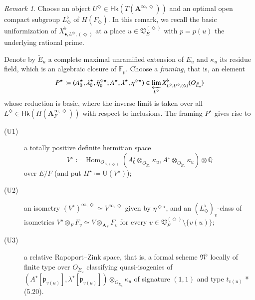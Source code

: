 \documentclass[12pt]{amsart}
\numberwithin{equation}{section}
\theoremstyle{plain}
\theoremstyle{definition}
\theoremstyle{remark}
\newtheorem{remark}[proposition]{Remark}
\renewcommand{\b}[1]{\mathbf{#1}}
\renewcommand{\d}[1]{\mathbb{#1}}
\newcommand{\f}[1]{\mathfrak{#1}}
\renewcommand{\r}[1]{\mathrm{#1}}
\renewcommand{\sf}[1]{\mathsf{#1}}
\renewcommand{\(}{\left(}
\renewcommand{\)}{\right)}
\newcommand{\bA}{\b A}
\newcommand{\dF}{\d F}
\newcommand{\dQ}{\d Q}
\newcommand{\fN}{\f N}
\newcommand{\fV}{\f V}
\newcommand{\fp}{\f p}
\newcommand{\rU}{\r U}
\newcommand{\Hk}{\sf{Hk}}
\DeclareMathOperator{\Hom}{Hom}
\begin{document}
\begin{remark}\label{re:uniformization}
Choose an object $U^\Diamond\in\Hk(T(\bA^{\infty,\Diamond}))$ and an optimal open compact subgroup $L^\flat_\Diamond$ of $H(F_\Diamond)$. In this remark, we recall the basic uniformization of $X^\flat_{\bullet,U^\Diamond,(\Diamond)}$ at a place $u\in\fV_E^{(\Diamond)}$ with $p=p(u)$ the underlying rational prime.

Denote by $\breve{E}_u$ a complete maximal unramified extension of $E_u$ and $\kappa_u$ its residue field, which is an algebraic closure of $\dF_p$. Choose a \emph{framing}, that is, an element
\[
P^\star\coloneqq (A_0^\star,\lambda_0^\star,\bar\eta_0^{\Diamond\star};A^\star,\lambda^\star,\eta^{\Diamond\star})\in
\varprojlim_{L^\Diamond}X^\flat_{L^\Diamond,U^\Diamond,(\Diamond)}(O_{\breve{E}_u})
\]
whose reduction is basic, where the inverse limit is taken over all $L^\Diamond\in\Hk(H(\bA_F^{\infty,\Diamond}))$ with respect to inclusions. The framing $P^\star$ gives rise to
\begin{description}
  \item[(U1)] a totally positive definite hermitian space
      \[
      V^\star\coloneqq
      \Hom_{O_{E,(\Diamond)}}(A^\star_0\otimes_{O_{\breve{E}_u}}\kappa_u,A^\star\otimes_{O_{\breve{E}_u}}\kappa_u)\otimes\dQ
      \]
      over $E/F$ (and put $H^\star\coloneqq\rU(V^\star)$);

  \item[(U2)] an isometry $(V^\star)^{\infty,\Diamond}\simeq V^{\infty,\Diamond}$ given by $\eta^{\Diamond\star}$, and an $(L^\flat_\Diamond)_v$-class of isometries $V^\star\otimes_FF_v\simeq V\otimes_{\bA_F}F_v$ for every $v\in\fV_F^{(\Diamond)}\setminus\{v(u)\}$;

  \item[(U3)] a relative Rapoport--Zink space, that is, a formal scheme $\fN^\flat$ locally of finite type over $O_{\breve{E}_u}$ classifying quasi-isogenies of $(A^\star[\fp_{v(u)}],\lambda^\star[\fp_{v(u)}])\otimes_{O_{\breve{E}_u}}\kappa_u$ of signature $(1,1)$ and type $t_{v(u)}$ \cite{LMZ}*{(5.20)}.
\end{description}


\end{remark}
\end{document}
